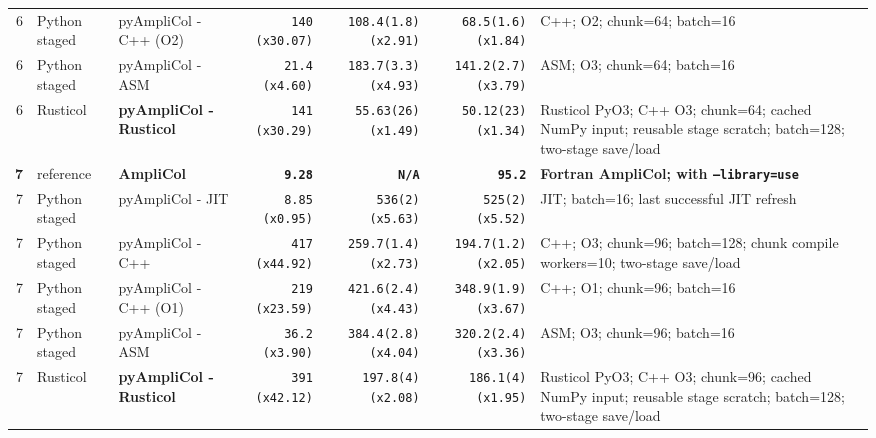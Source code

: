 \documentclass[10pt]{article}
\begin{document}
\begin{landscape}
\begin{center}
\begin{tabular}{@{}r L{0.92in} L{1.52in} r r r L{3.18in}@{}}
6 & Python staged & pyAmpliCol - C++ (O2) & \texttt{140} \textcolor{speedred}{\texttt{(x30.07)}} & \texttt{108.4(1.8)} \textcolor{speedred}{\texttt{(x2.91)}} & \texttt{68.5(1.6)} \textcolor{speedorange}{\texttt{(x1.84)}} & C++; O2; chunk=64; batch=16 \\
6 & Python staged & pyAmpliCol - ASM & \texttt{21.4} \textcolor{speedred}{\texttt{(x4.60)}} & \texttt{183.7(3.3)} \textcolor{speedred}{\texttt{(x4.93)}} & \texttt{141.2(2.7)} \textcolor{speedred}{\texttt{(x3.79)}} & ASM; O3; chunk=64; batch=16 \\
 6 & Rusticol & \textbf{pyAmpliCol - Rusticol} & \texttt{141} \textcolor{speedred}{\texttt{(x30.29)}} & \texttt{55.63(26)} \textcolor{speedorange}{\texttt{(x1.49)}} & \texttt{50.12(23)} \textcolor{speedorange}{\texttt{(x1.34)}} & Rusticol PyO3; C++ O3; chunk=64; cached NumPy input; reusable stage scratch; batch=128; two-stage save/load \\
\midrule[0.58pt]
 \textbf{7} & reference & \textbf{AmpliCol} & \textbf{\texttt{9.28}} & \textbf{\texttt{N/A}} & \textbf{\texttt{95.2}} & \textbf{Fortran AmpliCol; with \texttt{--library=use}} \\
7 & Python staged & pyAmpliCol - JIT & \texttt{8.85} \textcolor{speedgreen}{\texttt{(x0.95)}} & \texttt{536(2)} \textcolor{speedred}{\texttt{(x5.63)}} & \texttt{525(2)} \textcolor{speedred}{\texttt{(x5.52)}} & JIT; batch=16; last successful JIT refresh \\
7 & Python staged & pyAmpliCol - C++ & \texttt{417} \textcolor{speedred}{\texttt{(x44.92)}} & \texttt{259.7(1.4)} \textcolor{speedred}{\texttt{(x2.73)}} & \texttt{194.7(1.2)} \textcolor{speedred}{\texttt{(x2.05)}} & C++; O3; chunk=96; batch=128; chunk compile workers=10; two-stage save/load \\
7 & Python staged & pyAmpliCol - C++ (O1) & \texttt{219} \textcolor{speedred}{\texttt{(x23.59)}} & \texttt{421.6(2.4)} \textcolor{speedred}{\texttt{(x4.43)}} & \texttt{348.9(1.9)} \textcolor{speedred}{\texttt{(x3.67)}} & C++; O1; chunk=96; batch=16 \\
7 & Python staged & pyAmpliCol - ASM & \texttt{36.2} \textcolor{speedred}{\texttt{(x3.90)}} & \texttt{384.4(2.8)} \textcolor{speedred}{\texttt{(x4.04)}} & \texttt{320.2(2.4)} \textcolor{speedred}{\texttt{(x3.36)}} & ASM; O3; chunk=96; batch=16 \\
 7 & Rusticol & \textbf{pyAmpliCol - Rusticol} & \texttt{391} \textcolor{speedred}{\texttt{(x42.12)}} & \texttt{197.8(4)} \textcolor{speedred}{\texttt{(x2.08)}} & \texttt{186.1(4)} \textcolor{speedorange}{\texttt{(x1.95)}} & Rusticol PyO3; C++ O3; chunk=96; cached NumPy input; reusable stage scratch; batch=128; two-stage save/load \\

\end{tabular}
\end{center}
\end{landscape}
\end{document}

